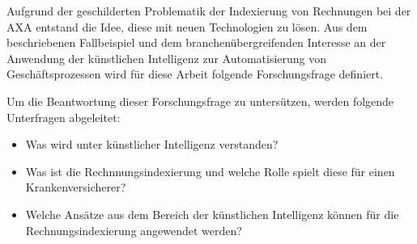 Aufgrund der geschilderten Problematik der Indexierung von Rechnungen bei der AXA entstand die Idee, diese mit neuen Technologien zu lösen. Aus dem beschriebenen Fallbeispiel und dem branchenübergreifenden Interesse an der Anwendung der künstlichen Intelligenz zur Automatisierung von Geschäftsprozessen wird für diese Arbeit folgende Forschungsfrage definiert.

{
    \medskip
    \setlength{\fboxsep}{1em}
    \noindent{}
    \medskip
}

Um die Beantwortung dieser Forschungsfrage zu untersützen, werden folgende Unterfragen abgeleitet:

\begin{itemize}
    \item Was wird unter künstlicher Intelligenz verstanden?
    \item Was ist die Rechnnungsindexierung und welche Rolle spielt diese für einen Krankenversicherer?
    \item Welche Ansätze aus dem Bereich der künstlichen Intelligenz können für die Rechnungsindexierung angewendet werden?
\end{itemize}






